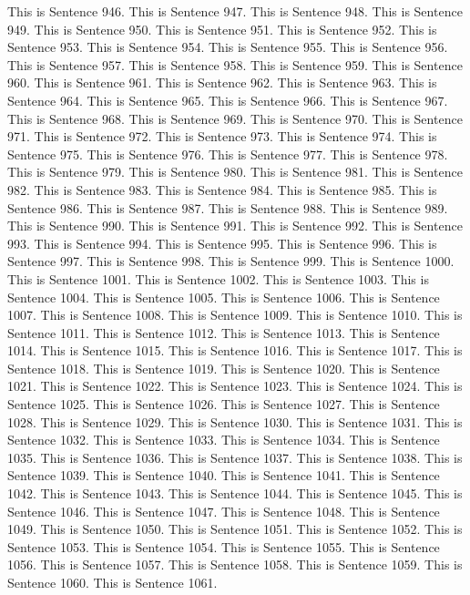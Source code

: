 \documentclass{article}
\begin{document}
This is Sentence 946.
This is Sentence 947.
This is Sentence 948.
This is Sentence 949.
This is Sentence 950.
This is Sentence 951.
This is Sentence 952.
This is Sentence 953.
This is Sentence 954.
This is Sentence 955.
This is Sentence 956.
This is Sentence 957.
This is Sentence 958.
This is Sentence 959.
This is Sentence 960.
This is Sentence 961.
This is Sentence 962.
This is Sentence 963.
This is Sentence 964.
This is Sentence 965.
This is Sentence 966.
This is Sentence 967.
This is Sentence 968.
This is Sentence 969.
This is Sentence 970.
This is Sentence 971.
This is Sentence 972.
This is Sentence 973.
This is Sentence 974.
This is Sentence 975.
This is Sentence 976.
This is Sentence 977.
This is Sentence 978.
This is Sentence 979.
This is Sentence 980.
This is Sentence 981.
This is Sentence 982.
This is Sentence 983.
This is Sentence 984.
This is Sentence 985.
This is Sentence 986.
This is Sentence 987.
This is Sentence 988.
This is Sentence 989.
This is Sentence 990.
This is Sentence 991.
This is Sentence 992.
This is Sentence 993.
This is Sentence 994.
This is Sentence 995.
This is Sentence 996.
This is Sentence 997.
This is Sentence 998.
This is Sentence 999.
This is Sentence 1000.
This is Sentence 1001.
This is Sentence 1002.
This is Sentence 1003.
This is Sentence 1004.
This is Sentence 1005.
This is Sentence 1006.
This is Sentence 1007.
This is Sentence 1008.
This is Sentence 1009.
This is Sentence 1010.
This is Sentence 1011.
This is Sentence 1012.
This is Sentence 1013.
This is Sentence 1014.
This is Sentence 1015.
This is Sentence 1016.
This is Sentence 1017.
This is Sentence 1018.
This is Sentence 1019.
This is Sentence 1020.
This is Sentence 1021.
This is Sentence 1022.
This is Sentence 1023.
This is Sentence 1024.
This is Sentence 1025.
This is Sentence 1026.
This is Sentence 1027.
This is Sentence 1028.
This is Sentence 1029.
This is Sentence 1030.
This is Sentence 1031.
This is Sentence 1032.
This is Sentence 1033.
This is Sentence 1034.
This is Sentence 1035.
This is Sentence 1036.
This is Sentence 1037.
This is Sentence 1038.
This is Sentence 1039.
This is Sentence 1040.
This is Sentence 1041.
This is Sentence 1042.
This is Sentence 1043.
This is Sentence 1044.
This is Sentence 1045.
This is Sentence 1046.
This is Sentence 1047.
This is Sentence 1048.
This is Sentence 1049.
This is Sentence 1050.
This is Sentence 1051.
This is Sentence 1052.
This is Sentence 1053.
This is Sentence 1054.
This is Sentence 1055.
This is Sentence 1056.
This is Sentence 1057.
This is Sentence 1058.
This is Sentence 1059.
This is Sentence 1060.
This is Sentence 1061.
\end{document}
